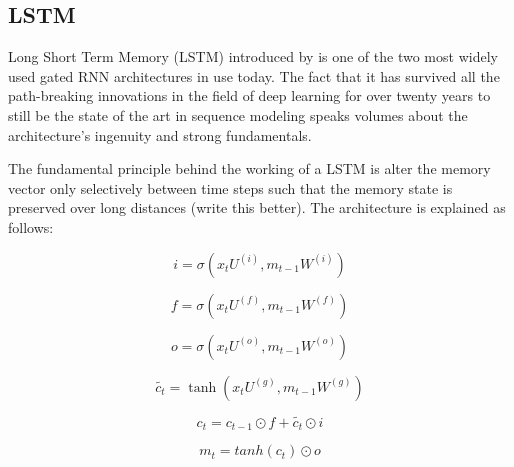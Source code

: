 \subsection{LSTM}
Long Short Term Memory (LSTM) introduced by \cite{LSTM} is one of the two most widely used gated RNN architectures in use today. The fact that it has survived all the path-breaking innovations in the field of deep learning for over twenty years to still be the state of the art in sequence modeling speaks volumes about the architecture's ingenuity and strong fundamentals. 

The fundamental principle behind the working of a LSTM is alter the memory vector only selectively between time steps such that the memory state is preserved over long distances (write this better). The architecture is explained as follows:


\begin{equation}
i= \sigma(x_t U^{(i)}, m_{t-1}W^{(i)})
\end{equation}

\begin{equation}
f= \sigma(x_t U^{(f)}, m_{t-1}W^{(f)})
\end{equation}

\begin{equation}
o= \sigma(x_t U^{(o)}, m_{t-1}W^{(o)})
\end{equation}

\begin{equation}
\widetilde {c_t}= \tanh(x_t U^{(g)}, m_{t-1}W^{(g)})
\end{equation}

\begin{equation}
c_t = c_{t-1} \odot f + \widetilde{c_t} \odot i
\end{equation}

\begin{equation}
m_t = tanh(c_t) \odot o
\end{equation}

